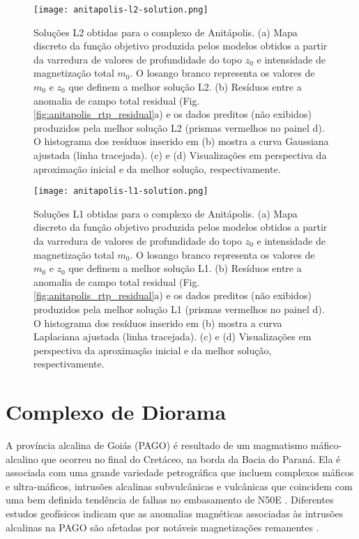 \pagebreak

\begin{figure}[!htb]
	\texttt{[image: anitapolis-l2-solution.png]}
	\caption{Soluções L2 obtidas para o complexo de Anitápolis. 
		(a) Mapa discreto da função objetivo produzida pelos modelos obtidos a partir da varredura de valores de profundidade do topo $z_{0}$ e intensidade de magnetização total $m_{0}$. 
		O losango branco representa os valores de $m_{0}$ e $z_{0}$ que definem a melhor solução L2.
		(b) Resíduos entre a anomalia de campo total residual (Fig. \ref{fig:anitapolis_rtp_residual}a) e os dados preditos (não exibidos) produzidos pela melhor solução L2 (prismas vermelhos no painel d). 
		O histograma dos resíduos inserido em (b) mostra a curva
		Gaussiana ajustada (linha tracejada). 
		(c) e (d) Visualizações em perspectiva da aproximação inicial e da melhor solução, respectivamente.
	}
	\label{fig:anitapolis_l2_result}
\end{figure}

\pagebreak

\begin{figure}[!htb]
	\texttt{[image: anitapolis-l1-solution.png]}
	\caption{Soluções L1 obtidas para o complexo de Anitápolis. 
		(a) Mapa discreto da função objetivo produzida pelos modelos obtidos a partir da varredura de valores de profundidade do topo $z_{0}$ e intensidade de magnetização total $m_{0}$. 
		O losango branco representa os valores de $m_{0}$ e $z_{0}$ que definem a melhor solução L1.
		(b) Resíduos entre a anomalia de campo total residual (Fig. \ref{fig:anitapolis_rtp_residual}a) e os dados preditos (não exibidos) produzidos pela melhor solução L1 (prismas vermelhos no painel d). 
		O histograma dos resíduos inserido em (b) mostra a curva
		Laplaciana ajustada (linha tracejada). 
		(c) e (d) Visualizações em perspectiva da aproximação inicial e da melhor solução, respectivamente.
	}
	\label{fig:anitapolis_l1_result}
\end{figure}
\pagebreak


\section{Complexo de Diorama}
\label{subsec:diorama_complex}


A província alcalina de Goiás (PAGO) é resultado de um magmatismo máfico-alcalino que ocorreu no final do Cretáceo, na borda da Bacia do Paraná.
Ela é associada com uma grande variedade petrográfica que incluem complexos máficos e ultra-máficos, intrusões alcalinas subvulcânicas e vulcânicas que coincidem com uma bem definida tendência de falhas no embasamento de N50E \citep{junqueirabrod_etal2002, junqueira_brod2005}.
Diferentes estudos geofísicos indicam que as anomalias magnéticas associadas às intrusões alcalinas na PAGO são afetadas por notáveis magnetizações remanentes \citep[por exemplo,][]{dutra_etal2012, marangoni_mantovani2013, 
dutra_etal2014, oliveirajr_etal2015, zhang-2018, reis_etal2020}.

